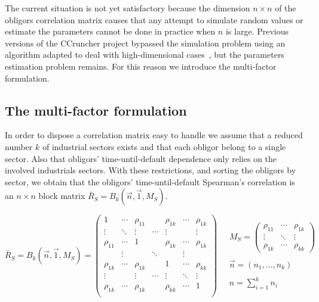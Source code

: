 \documentclass[11pt,fleqn]{book} %
\begin{document}
The current situation is not yet satisfactory because the dimension 
$n {\times} n$ of the obligors correlation matrix causes that any 
attempt to simulate random values or estimate the parameters cannot 
be done in practice when $n$ is large. 
Previous versions of the CCruncher project bypassed the simulation problem 
using an algorithm adapted to deal with high-dimensional 
cases~\cite{torrent:2011}, but the parameters estimation problem remains. 
For this reason we introduce the multi-factor formulation.

\subsection{The multi-factor formulation}

In order to dispose a correlation matrix easy to handle we assume that a 
reduced number $k$ of industrial sectors exists and that each obligor belong 
to a single sector. Also that obligors' time-until-default dependence only 
relies on the involved industrials sectors. With these restrictions, and 
sorting the obligors by sector, we obtain that the obligors' time-until-default
Spearman's correlation is an $n {\times} n$ block matrix 
$\bar{R}_S = B_k(\vec{n},\vec{1},M_S)$.

\begin{displaymath}
	\bar{R}_S = B_k(\vec{n},\vec{1},M_S) = 
	\left(
	\begin{array}{ccccccc}
		1         & \cdots & \rho_{11} &        & \rho_{1k} & \cdots & \rho_{1k} \\
		\vdots    & \ddots & \vdots    & \cdots & \vdots    &        & \vdots    \\
		\rho_{11} & \cdots & 1         &        & \rho_{1k} & \cdots & \rho_{1k} \\
		
		          & \vdots &           & \ddots &           & \vdots &           \\
		
		\rho_{1k} & \cdots & \rho_{1k} &        & 1         & \cdots & \rho_{kk} \\
		\vdots    &        & \vdots    & \cdots & \vdots    & \ddots & \vdots    \\
		\rho_{1k} & \cdots & \rho_{1k} &        & \rho_{kk} & \cdots & 1         \\
	\end{array}
	\right)
	\quad 
	\begin{array}{l}
		M_S = 
		\left(
		\begin{array}{ccc}
			\rho_{11} & \cdots & \rho_{1k} \\
			\vdots    & \ddots & \vdots    \\
			\rho_{1k} & \cdots & \rho_{kk}
		\end{array}
		\right) \\
		\\
		\vec{n} = (n_1,\dots,n_k) \\
		\\
		n = \displaystyle \sum_{i=1}^{k} n_i
	\end{array}
\end{displaymath}
\end{document}
